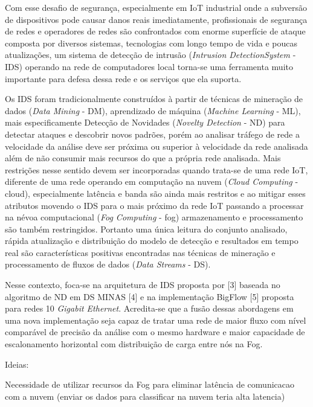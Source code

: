 Com esse desafio de segurança, especialmente em IoT industrial onde a subversão
de dispositivos pode causar danos reais imediatamente, profissionais de
segurança de redes e operadores de redes são confrontados com enorme superfície
de ataque composta por diversos sistemas, tecnologias com longo tempo de vida e
poucas atualizações, um sistema de detecção de intrusão (\emph{Intrusion DetectionSystem} - IDS)
operando na rede de computadores local torna-se uma ferramenta
muito importante para defesa dessa rede e os serviços que ela suporta.

Os IDS foram tradicionalmente construídos à partir de técnicas de mineração de
dados (\emph{Data Mining} - DM), aprendizado de máquina (\emph{Machine Learning} - ML), mais
especificamente Detecção de Novidades (\emph{Novelty Detection} - ND) para detectar
ataques e descobrir novos padrões, porém ao analisar tráfego de rede a
velocidade da análise deve ser próxima ou superior à velocidade da rede
analisada além de não consumir mais recursos do que a própria rede analisada.
Mais restrições nesse sentido devem ser incorporadas quando trata-se de uma rede
IoT, diferente de uma rede operando em computação na nuvem (\emph{Cloud Computing} - cloud),
especialmente latência e banda são ainda mais restritos e ao mitigar
esses atributos movendo o IDS para o mais próximo da
rede IoT passando a processar na névoa computacional (\emph{Fog Computing} - fog)
armazenamento e processamento são também restringidos. Portanto uma única
leitura do conjunto analisado, rápida atualização e distribuição do modelo de
detecção e resultados em tempo real são características positivas encontradas
nas técnicas de mineração e processamento de fluxos de dados (\emph{Data Streams} -
DS).

Nesse contexto, foca-se na arquitetura de IDS proposta por [3] baseada no
algoritmo de ND em DS MINAS [4] e na implementação BigFlow [5] proposta para
redes 10 \emph{Gigabit Ethernet}. Acredita-se que a fusão dessas abordagens em uma nova
implementação seja capaz de tratar uma rede de maior fluxo com nível comparável
de precisão da análise com o mesmo hardware e maior capacidade de escalonamento
horizontal com distribuição de carga entre nós na Fog.

Ideias:

Necessidade de utilizar recursos da Fog para eliminar latência de comunicacao com a nuvem (enviar os dados para classificar na nuvem teria alta latencia)

